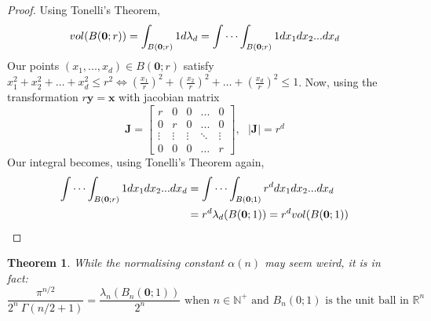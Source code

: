 \documentclass{article}
\theoremstyle{plain}
\newtheorem{thm}{Theorem}[section]
\theoremstyle{definition}
\theoremstyle{remark}
\begin{document}
\begin{proof}
    Using Tonelli's Theorem,
    \[vol (B(\mathbf{0};r)) = \int_{B(\mathbf{0};r)} 1d\lambda _d = \idotsint _{B(\mathbf{0};r)} 1dx_1dx_2...dx_d\]
    Our points $(x_1,...,x_d) \in B(\mathbf{0}; r)$ satisfy $x_1^2 + x_2^2 + \dots +x_d^2 \le r^2 \iff \left (\frac{x_1}{r} \right)^2 + \left (\frac{x_2}{r} \right)^2 + \dots + \left (\frac{x_d}{r} \right)^2 \le 1 $.
    Now, using the transformation $r\mathbf{y} = \mathbf{x}$ with jacobian matrix
    \[
    \mathbf{J} = \begin{bmatrix}
        r & 0 & 0 & ... & 0 \\
        0 & r & 0 & ... & 0 \\
         \vdots &  \vdots & \vdots & \ddots & \vdots \\ 
         0 & 0 & 0 & \dots & r
    \end{bmatrix}, \ \ \ |\mathbf{J}| = r^d
    \]
    Our integral becomes, using Tonelli's Theorem again,
    \begin{align*}
        \idotsint _{B(\mathbf{0};r)} 1dx_1dx_2...dx_d & = \idotsint _{B(\mathbf{0};1)} r^ddx_1dx_2...dx_d \\ & = r^d \lambda _d(B(\mathbf{0};1)) = r^d vol(B(\mathbf{0};1))
    \end{align*}
\end{proof}

\newpage 
\begin{thm}
    While the normalising constant $\alpha (n)$ may seem weird, it is in fact:
    \[
    \frac{\pi ^{n/2}}{2^n \  \Gamma (n/2 + 1)} = \frac{\lambda_n(B_n(\mathbf{0};1))}{2^n} \text{ when } n\in \mathbb{N}^+ \text{ and } B_n(0;1) \text{ is the unit ball in } \mathbb{R}^n
    \]    
    
\end{thm}
\end{document}

